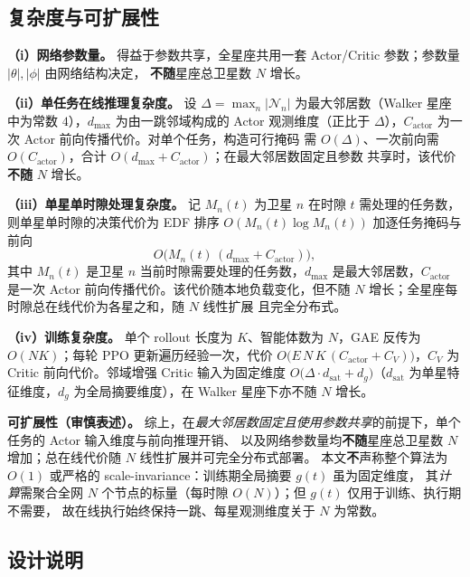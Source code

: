 \documentclass[a4paper,11pt]{article}
\begin{document}
\subsection{复杂度与可扩展性}
\label{subsec:complexity}

\noindent\textbf{（i）网络参数量。}
得益于参数共享，全星座共用一套 Actor/Critic 参数；参数量 $|\theta|,|\phi|$ 由网络结构决定，
\textbf{不随}星座总卫星数 $N$ 增长。

\noindent\textbf{（ii）单任务在线推理复杂度。}
设 $\Delta=\max_n|\mathcal{N}_n|$ 为最大邻居数（Walker 星座中为常数 $4$），$d_{\max}$ 为由一跳邻域构成的
Actor 观测维度（正比于 $\Delta$），$C_{\mathrm{actor}}$ 为一次 Actor 前向传播代价。对单个任务，构造可行掩码
需 $O(\Delta)$、一次前向需 $O(C_{\mathrm{actor}})$，合计 $O(d_{\max}+C_{\mathrm{actor}})$；在最大邻居数固定且参数
共享时，该代价\textbf{不随} $N$ 增长。

\noindent\textbf{（iii）单星单时隙处理复杂度。}
记 $M_n(t)$ 为卫星 $n$ 在时隙 $t$ 需处理的任务数，则单星单时隙的决策代价为 EDF 排序
$O(M_n(t)\log M_n(t))$ 加逐任务掩码与前向
\begin{equation}
O\big(M_n(t)\,(d_{\max}+C_{\mathrm{actor}})\big),
\label{eq:online_complexity}
\end{equation}
其中 $M_n(t)$ 是卫星 $n$ 当前时隙需要处理的任务数，$d_{\max}$ 是最大邻居数，$C_{\mathrm{actor}}$ 是一次 Actor
前向传播代价。该代价随本地负载变化，但不随 $N$ 增长；全星座每时隙总在线代价为各星之和，随 $N$ 线性扩展
且完全分布式。

\noindent\textbf{（iv）训练复杂度。}
单个 rollout 长度为 $K$、智能体数为 $N$，GAE 反传为 $O(NK)$；每轮 PPO 更新遍历经验一次，代价
$O\big(E\,N\,K\,(C_{\mathrm{actor}}+C_V)\big)$，$C_V$ 为 Critic 前向代价。邻域增强 Critic 输入为固定维度
$O\big(\Delta\cdot d_{\mathrm{sat}}+d_g\big)$（$d_{\mathrm{sat}}$ 为单星特征维度，$d_g$ 为全局摘要维度），在 Walker
星座下亦不随 $N$ 增长。

\noindent\textbf{可扩展性（审慎表述）。}
综上，在\emph{最大邻居数固定且使用参数共享}的前提下，单个任务的 Actor 输入维度与前向推理开销、
以及网络参数量均\textbf{不随}星座总卫星数 $N$ 增加；总在线代价随 $N$ 线性扩展并可完全分布式部署。
本文\textbf{不}声称整个算法为 $O(1)$ 或严格的 scale-invariance：训练期全局摘要 $g(t)$ 虽为固定维度，
其\emph{计算}需聚合全网 $N$ 个节点的标量（每时隙 $O(N)$）；但 $g(t)$ 仅用于训练、执行期不需要，
故在线执行始终保持一跳、每星观测维度关于 $N$ 为常数。

\subsection{设计说明}
\label{subsec:design_note}
\end{document}
